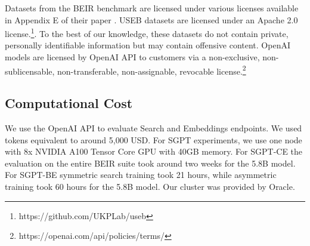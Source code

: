\documentclass{article}
\begin{document}
Datasets from the BEIR benchmark are licensed under various licenses available in Appendix E of their paper \cite{thakur2021beir}. USEB datasets \cite{wang2021tsdae} are licensed under an Apache 2.0 license.\footnote{https://github.com/UKPLab/useb}. To the best of our knowledge, these datasets do not contain private, personally identifiable information but may contain offensive content. OpenAI models are licensed by OpenAI API to customers via a non-exclusive, non-sublicensable, non-transferable, non-assignable, revocable license.\footnote{https://openai.com/api/policies/terms/}

\subsection{Computational Cost}
\label{sec:compute}

We use the OpenAI API to evaluate Search and Embeddings endpoints. We used tokens equivalent to around 5,000 USD. For SGPT experiments, we use one node with 8x NVIDIA A100 Tensor Core GPU with 40GB memory. For SGPT-CE the evaluation on the entire BEIR suite took around two weeks for the 5.8B model. For SGPT-BE symmetric search training took 21 hours, while asymmetric training took 60 hours for the 5.8B model. Our cluster was provided by Oracle.
\end{document}

